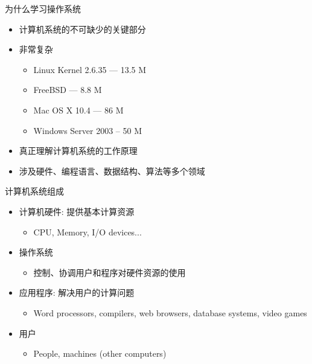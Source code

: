 \documentclass[xcolor=svgnames]{beamer}
\begin{document}
\begin{CJK*}{UTF8}{gbsn}
\begin{frame}{为什么学习操作系统}
\begin{itemize}
\item 计算机系统的不可缺少的关键部分
\item 非常复杂 
\begin{itemize}
\item Linux Kernel 2.6.35 --- 13.5 M
\item FreeBSD --- 8.8 M 
\item Mac OS X 10.4 --- 86 M 
\item Windows Server 2003 -- 50 M
\end{itemize}
\item 真正理解计算机系统的工作原理
\item 涉及硬件、编程语言、数据结构、算法等多个领域
\end{itemize}
\end{frame}

\begin{frame}{计算机系统组成}
\begin{itemize}
\item 计算机硬件: 提供基本计算资源
\begin{itemize}
\item CPU, Memory, I/O devices...
\end{itemize}
\item 操作系统
\begin{itemize}
\item 控制、协调用户和程序对硬件资源的使用
\end{itemize}
\item 应用程序: 解决用户的计算问题
\begin{itemize}
\item Word processors, compilers, web browsers, database
systems, video games
\end{itemize}
\item 用户
\begin{itemize}
\item People, machines (other computers)
\end{itemize}
\end{itemize}
\end{frame}


\end{CJK*}
\end{document}
